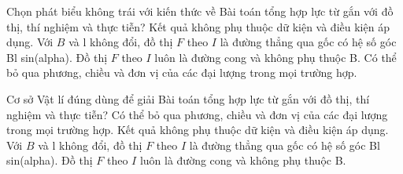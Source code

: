 \begin{ex}
Chọn phát biểu không trái với kiến thức về Bài toán tổng hợp lực từ gắn với đồ thị, thí nghiệm và thực tiễn?
\choice
{Kết quả không phụ thuộc dữ kiện và điều kiện áp dụng.}
{\True Với $B$ và l không đổi, đồ thị $F$ theo $I$ là đường thẳng qua gốc có hệ số góc Bl sin(alpha).}
{Đồ thị $F$ theo $I$ luôn là đường cong và không phụ thuộc B.}
{Có thể bỏ qua phương, chiều và đơn vị của các đại lượng trong mọi trường hợp.}
\end{ex}

\begin{ex}
Cơ sở Vật lí đúng dùng để giải Bài toán tổng hợp lực từ gắn với đồ thị, thí nghiệm và thực tiễn?
\choice
{Có thể bỏ qua phương, chiều và đơn vị của các đại lượng trong mọi trường hợp.}
{Kết quả không phụ thuộc dữ kiện và điều kiện áp dụng.}
{\True Với $B$ và l không đổi, đồ thị $F$ theo $I$ là đường thẳng qua gốc có hệ số góc Bl sin(alpha).}
{Đồ thị $F$ theo $I$ luôn là đường cong và không phụ thuộc B.}
\end{ex}


